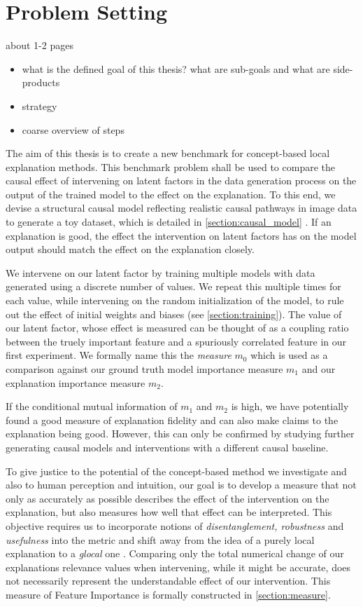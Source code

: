\chapter{Problem Setting}\label{chapter:problem_setting}
{ \color{red}

    about 1-2 pages

    \begin{itemize}
        \item what is the defined goal of this thesis? what are sub-goals and what are side-products
        \item strategy
        \item coarse overview of steps
    \end{itemize}
}
The aim of this thesis is to create a new benchmark for concept-based local explanation methods. This benchmark problem shall be used to compare the causal effect of intervening on latent factors in the data generation process on the output of the trained model to the effect on the explanation.
To this end, we devise a structural causal model reflecting realistic causal pathways in image data to generate a toy dataset, which is detailed in \autoref{section:causal_model} .
If an explanation is good, the effect the intervention on latent factors has on the model output should match the effect on the explanation closely.


We intervene on our latent factor by training multiple models with data generated using a discrete number of values. We repeat this multiple times for each value, while intervening on the random initialization of the model, to rule out the effect of initial weights and biases (see \autoref{section:training}).  
The value of our latent factor, whose effect is measured can be thought of as a coupling ratio between the truely important feature and a spuriously correlated feature in our first experiment. We formally name this the \textit{measure} $m_0$ which is used as a comparison against our ground truth model importance measure $m_1$ and our explanation importance measure $m_2$. 


If the conditional mutual information of $m_1$ and $m_2$ is high, we have potentially found a good measure of explanation fidelity and can also make claims to the explanation being good. However, this can only be confirmed by studying further generating causal models and interventions with a different causal baseline. 


To give justice to the potential of the concept-based method we investigate and also to human perception and intuition, our goal is to develop a measure that not only as accurately as possible describes the effect of the intervention on the explanation, but also measures how well that effect can be interpreted. This objective requires us to incorporate notions of \textit{disentanglement, robustness} and \textit{usefulness} into the metric and shift away from the idea of a purely local explanation to a \textit{glocal} one \cite{Achtibat2022}. Comparing only the total numerical change of our explanations relevance values when intervening, while it might be accurate, does not necessarily represent the understandable effect of our intervention. 
This measure of Feature Importance is formally constructed in \autoref{section:measure}.


